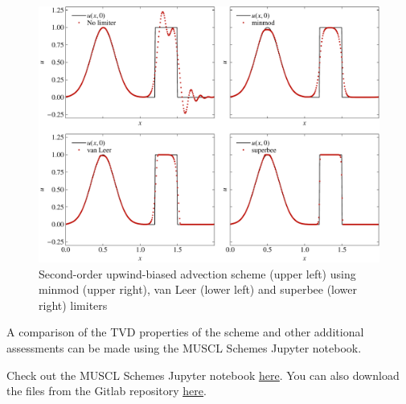 \begin{figure}[htb]
	\centering
	\includegraphics[width=\linewidth]{Pictures/advection_muscl}
	\caption{Second-order upwind-biased advection scheme (upper left) using minmod (upper right), van Leer (lower left) and superbee (lower right) limiters}
	\label{fig:advection_muscl}
\end{figure}

A comparison of the TVD properties of the scheme and other additional assessments can be made using the MUSCL Schemes Jupyter notebook. 
\begin{jupyternote}
	Check out the MUSCL Schemes Jupyter notebook \href{\binderurl}{\underline{here}}. You can also download the files from the Gitlab repository \href{\repourl}{\underline{here}}.
\end{jupyternote}

